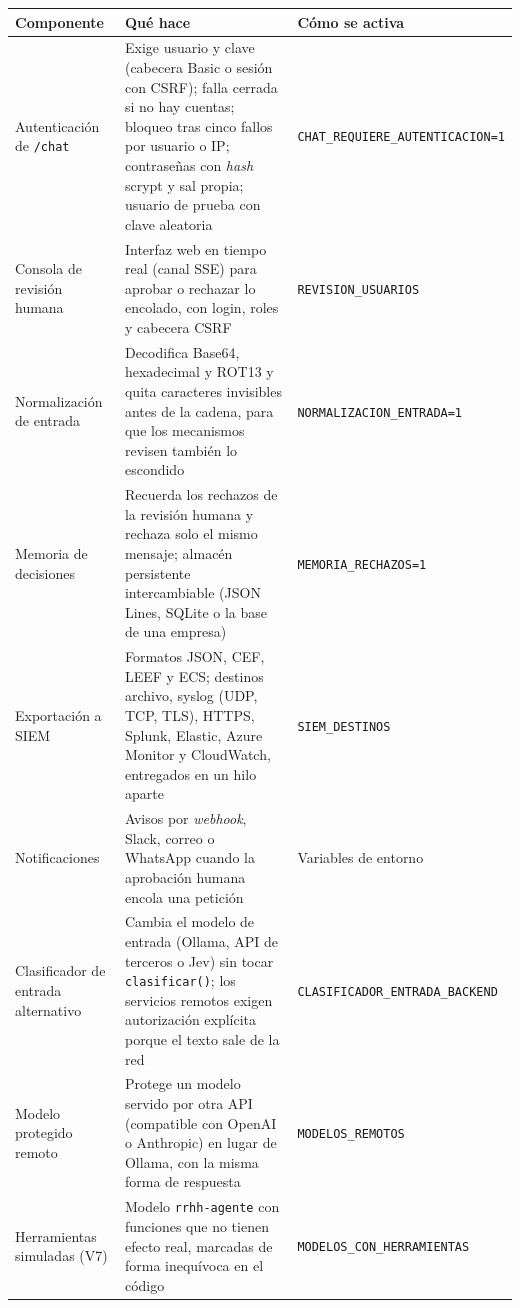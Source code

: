 \documentclass[11pt,letterpaper]{article}
\begin{document}
\begin{center}
\small
\begin{tabular}{@{}p{3.3cm}p{6.4cm}p{3.7cm}@{}}
\toprule
\textbf{Componente} & \textbf{Qué hace} & \textbf{Cómo se activa} \\
\midrule
Autenticación de \texttt{/chat} & Exige usuario y clave (cabecera Basic o sesión con CSRF); falla cerrada si no hay cuentas; bloqueo tras cinco fallos por usuario o IP; contraseñas con \emph{hash} scrypt y sal propia; usuario de prueba con clave aleatoria & \texttt{CHAT\_REQUIERE\_\-AUTENTICACION=1} \\
Consola de revisión humana & Interfaz web en tiempo real (canal SSE) para aprobar o rechazar lo encolado, con login, roles y cabecera CSRF & \texttt{REVISION\_USUARIOS} \\
Normalización de entrada & Decodifica Base64, hexadecimal y ROT13 y quita caracteres invisibles antes de la cadena, para que los mecanismos revisen también lo escondido & \texttt{NORMALIZACION\_\-ENTRADA=1} \\
Memoria de decisiones & Recuerda los rechazos de la revisión humana y rechaza solo el mismo mensaje; almacén persistente intercambiable (JSON Lines, SQLite o la base de una empresa) & \texttt{MEMORIA\_RECHAZOS=1} \\
Exportación a SIEM & Formatos JSON, CEF, LEEF y ECS; destinos archivo, syslog (UDP, TCP, TLS), HTTPS, Splunk, Elastic, Azure Monitor y CloudWatch, entregados en un hilo aparte & \texttt{SIEM\_DESTINOS} \\
Notificaciones & Avisos por \emph{webhook}, Slack, correo o WhatsApp cuando la aprobación humana encola una petición & Variables de entorno \\
Clasificador de entrada alternativo & Cambia el modelo de entrada (Ollama, API de terceros o Jev) sin tocar \texttt{clasificar()}; los servicios remotos exigen autorización explícita porque el texto sale de la red & \texttt{CLASIFICADOR\_ENTRADA\_\-BACKEND} \\
Modelo protegido remoto & Protege un modelo servido por otra API (compatible con OpenAI o Anthropic) en lugar de Ollama, con la misma forma de respuesta & \texttt{MODELOS\_REMOTOS} \\
Herramientas simuladas (V7) & Modelo \texttt{rrhh-agente} con funciones que no tienen efecto real, marcadas de forma inequívoca en el código & \texttt{MODELOS\_CON\_\-HERRAMIENTAS} \\
\bottomrule
\end{tabular}
\end{center}
\end{document}
